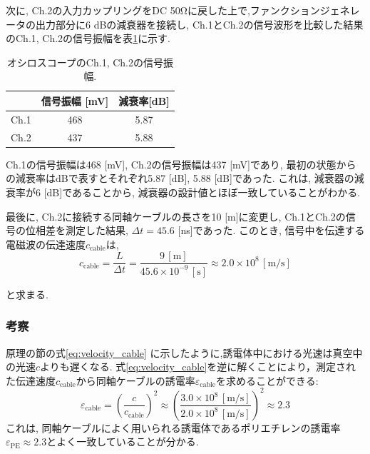\documentclass[uplatex,dvipdfmx,a4j,12pt]{jsarticle}
\begin{document}
次に, Ch.2の入力カップリングをDC 50\si{\ohm}に戻した上で,ファンクションジェネレータの出力部分に6 dBの減衰器を接続し, Ch.1とCh.2の信号波形を比較した結果のCh.1, Ch.2の信号振幅を表\ref{table:1-1-3}に示す.
\begin{table}[h]
    \centering
    \caption{オシロスコープのCh.1, Ch.2の信号振幅.}
    \label{table:1-1-3}
    \begin{tabular}{ccc}
        \hline
        & 信号振幅 [mV]& 減衰率[dB]\\
        \hline\hline
        Ch.1 & 468 & 5.87\\
        Ch.2 & 437 & 5.88\\
        \hline
    \end{tabular}
\end{table}
Ch.1の信号振幅は468 [mV], Ch.2の信号振幅は437 [mV]であり, 最初の状態からの減衰率はdBで表すとそれぞれ5.87 [dB], 5.88 [dB]であった.
これは, 減衰器の減衰率が6 [dB]であることから, 減衰器の設計値とほぼ一致していることがわかる.

最後に, Ch.2に接続する同軸ケーブルの長さを10 [m]に変更し, Ch.1とCh.2の信号の位相差を測定した結果, $\Delta t = 45.6$ [ns]であった.
このとき, 信号中を伝達する電磁波の伝達速度$c_\mathrm{cable}$は,
\begin{equation}
  c_\mathrm{cable} = \frac{L}{\Delta t} = \frac{9\,\mathrm{[m]}}{45.6 \times 10^{-9}\,\mathrm{[s]}} \approx 2.0 \times 10^8 \mathrm{\,[m/s]}
\end{equation}

と求まる.







\subsubsection{考察}


原理の節の式\eqref{eq:velocity_cable} に示したように,誘電体中における光速は真空中の光速$c$よりも遅くなる.
式\eqref{eq:velocity_cable}を逆に解くことにより，測定された伝達速度$c_\mathrm{cable}$から同軸ケーブルの誘電率$\varepsilon_\mathrm{cable}$を求めることができる:
\begin{equation}
  \varepsilon_\mathrm{cable} = \left(\frac{c}{c_\mathrm{cable}}\right)^2 \approx \left(\frac{3.0 \times 10^8\,\mathrm{[m/s]}}{2.0 \times 10^8\,\mathrm{[m/s]}}\right)^2 \approx 2.3
\end{equation}
これは, 同軸ケーブルによく用いられる誘電体であるポリエチレンの誘電率$\varepsilon_\mathrm{PE} \approx 2.3$とよく一致していることが分かる.
\end{document}
